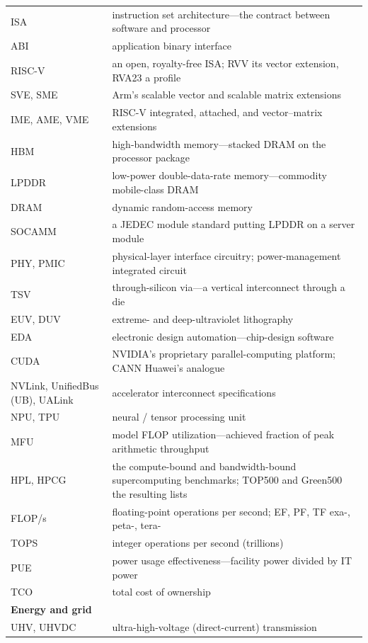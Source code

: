 \begin{longtable}{p{26mm}p{112mm}}
\midrule
ISA & instruction set architecture---the contract between software and processor \\
ABI & application binary interface \\
RISC-V & an open, royalty-free ISA; RVV its vector extension, RVA23 a profile \\
SVE, SME & Arm's scalable vector and scalable matrix extensions \\
IME, AME, VME & RISC-V integrated, attached, and vector--matrix extensions \\
HBM & high-bandwidth memory---stacked DRAM on the processor package \\
LPDDR & low-power double-data-rate memory---commodity mobile-class DRAM \\
DRAM & dynamic random-access memory \\
SOCAMM & a JEDEC module standard putting LPDDR on a server module \\
PHY, PMIC & physical-layer interface circuitry; power-management integrated circuit \\
TSV & through-silicon via---a vertical interconnect through a die \\
EUV, DUV & extreme- and deep-ultraviolet lithography \\
EDA & electronic design automation---chip-design software \\
CUDA & NVIDIA's proprietary parallel-computing platform; CANN Huawei's analogue \\
NVLink, UnifiedBus (UB), UALink & accelerator interconnect specifications \\
NPU, TPU & neural / tensor processing unit \\
MFU & model FLOP utilization---achieved fraction of peak arithmetic throughput \\
HPL, HPCG & the compute-bound and bandwidth-bound supercomputing benchmarks; TOP500 and Green500 the resulting lists \\
FLOP/s & floating-point operations per second; EF, PF, TF exa-, peta-, tera- \\
TOPS & integer operations per second (trillions) \\
PUE & power usage effectiveness---facility power divided by IT power \\
TCO & total cost of ownership \\
\midrule
\multicolumn{2}{l}{\textbf{Energy and grid}} \\
\midrule
UHV, UHVDC & ultra-high-voltage (direct-current) transmission \\

\end{longtable}
